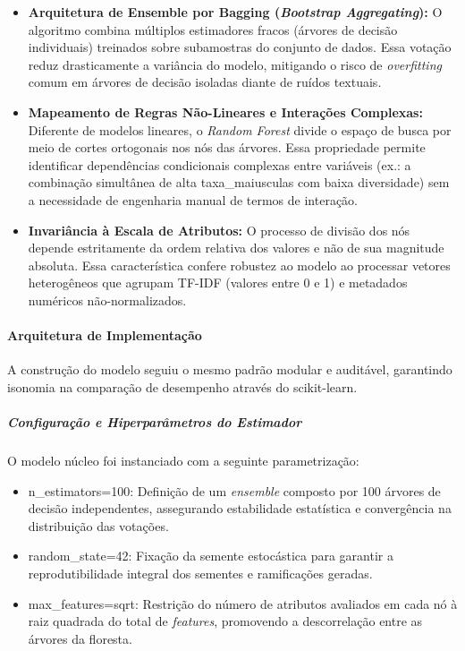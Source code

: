\documentclass[
  brazilian,
  11pt,
]{article}
\providecommand{\tightlist}{%
  \setlength{\itemsep}{0pt}\setlength{\parskip}{0pt}}
\begin{document}
\begin{itemize}
\tightlist
\item
  \textbf{Arquitetura de Ensemble por Bagging (\emph{Bootstrap Aggregating}):} O algoritmo combina múltiplos estimadores fracos (árvores de decisão individuais) treinados sobre subamostras do conjunto de dados. Essa votação reduz drasticamente a variância do modelo, mitigando o risco de \emph{overfitting} comum em árvores de decisão isoladas diante de ruídos textuais.
\item
  \textbf{Mapeamento de Regras Não-Lineares e Interações Complexas:} Diferente de modelos lineares, o \emph{Random Forest} divide o espaço de busca por meio de cortes ortogonais nos nós das árvores. Essa propriedade permite identificar dependências condicionais complexas entre variáveis (ex.: a combinação simultânea de alta taxa\_maiusculas com baixa diversidade) sem a necessidade de engenharia manual de termos de interação.
\item
  \textbf{Invariância à Escala de Atributos:} O processo de divisão dos nós depende estritamente da ordem relativa dos valores e não de sua magnitude absoluta. Essa característica confere robustez ao modelo ao processar vetores heterogêneos que agrupam TF-IDF (valores entre 0 e 1) e metadados numéricos não-normalizados.
\end{itemize}

\paragraph{Arquitetura de Implementação}\label{arquitetura-de-implementauxe7uxe3o-1}

A construção do modelo seguiu o mesmo padrão modular e auditável, garantindo isonomia na comparação de desempenho através do scikit-learn.

\subparagraph{Configuração e Hiperparâmetros do Estimador}\label{configurauxe7uxe3o-e-hiperparuxe2metros-do-estimador-1}

O modelo núcleo foi instanciado com a seguinte parametrização:

\begin{itemize}
\tightlist
\item
  n\_estimators=100: Definição de um \emph{ensemble} composto por 100 árvores de decisão independentes, assegurando estabilidade estatística e convergência na distribuição das votações.
\item
  random\_state=42: Fixação da semente estocástica para garantir a reprodutibilidade integral dos sementes e ramificações geradas.
\item
  max\_features=\textquotesingle sqrt\textquotesingle: Restrição do número de atributos avaliados em cada nó à raiz quadrada do total de \emph{features}, promovendo a descorrelação entre as árvores da floresta.
\end{itemize}
\end{document}
